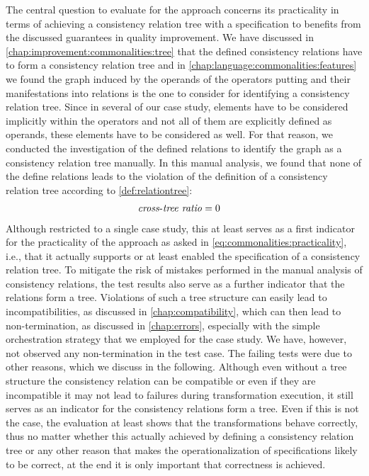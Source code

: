 The central question to evaluate for the \commonalities approach concerns its practicality in terms of achieving a consistency relation tree with a \commonalities specification to benefits from the discussed guarantees in quality improvement.
We have discussed in \autoref{chap:improvement:commonalities:tree} that the defined consistency relations have to form a consistency relation tree and in \autoref{chap:language:commonalities:features} we found the graph induced by the operands of the operators putting \commonalities and their manifestations into relations is the one to consider for identifying a consistency relation tree.
Since in several \commonalities of our case study, elements have to be considered implicitly within the operators and not all of them are explicitly defined as operands, these elements have to be considered as well.
For that reason, we conducted the investigation of the defined relations to identify the graph as a consistency relation tree manually.
In this manual analysis, we found that none of the define relations leads to the violation of the definition of a consistency relation tree according to \autoref{def:relationtree}:
\begin{align*}
    &
    \mathit{cross\mbox{-}tree\ ratio} = 0
\end{align*}
Although restricted to a single case study, this at least serves as a first indicator for the practicality of the approach as asked in \autoref{eq:commonalities:practicality}, i.e., that it actually supports or at least enabled the specification of a consistency relation tree.
To mitigate the risk of mistakes performed in the manual analysis of consistency relations, the test results also serve as a further indicator that the relations form a tree.
Violations of such a tree structure can easily lead to incompatibilities, as discussed in \autoref{chap:compatibility}, which can then lead to non-termination, as discussed in \autoref{chap:errors}, especially with the simple orchestration strategy that we employed for the case study.
We have, however, not observed any non-termination in the test case.
The failing tests were due to other reasons, which we discuss in the following.
Although even without a tree structure the consistency relation can be compatible or even if they are incompatible it may not lead to failures during transformation execution, it still serves as an indicator for the consistency relations form a tree.
Even if this is not the case, the evaluation at least shows that the transformations behave correctly, thus no matter whether this actually achieved by defining a consistency relation tree or any other reason that makes the operationalization of \commonalities specifications likely to be correct, at the end it is only important that correctness is achieved.

